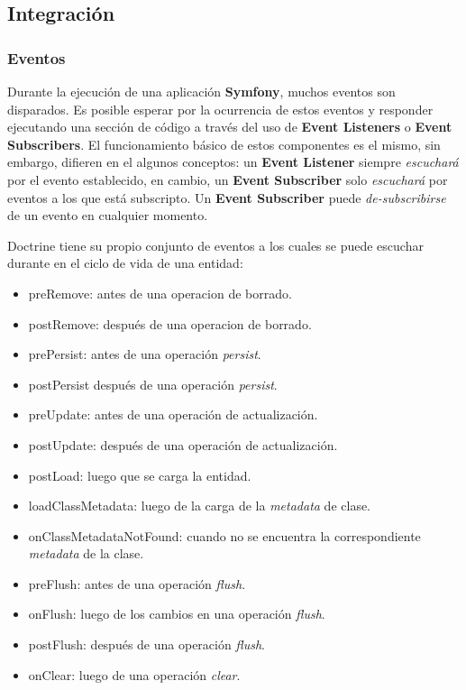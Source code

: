 \subsection{Integración}

\subsubsection{Eventos}%
\label{ssub:eventos}


Durante la ejecución de una aplicación \textbf{Symfony}, muchos eventos son disparados\@. Es posible esperar por la ocurrencia de estos eventos y responder ejecutando una sección de código a través del
uso de \textbf{Event Listeners} o \textbf{Event Subscribers}\@. El funcionamiento básico de estos componentes es el mismo, sin embargo, difieren en el algunos conceptos:
un \textbf{Event Listener} siempre \textit{escuchará} por el evento establecido, en cambio, un \textbf{Event Subscriber} solo \textit{escuchará} por eventos a los que está subscripto\@. Un \textbf{Event Subscriber} puede \textit{de-subscribirse} de un evento en cualquier momento.


Doctrine tiene su propio conjunto de eventos a los cuales se puede escuchar durante en el ciclo de vida de una entidad:

\begin{itemize}
    \item preRemove: antes de una operacion de borrado.
    \item postRemove: después de una operacion de borrado.
    \item prePersist: antes de una operación \textit{persist}.
    \item postPersist después de una operación \textit{persist}.
    \item preUpdate: antes de una operación de actualización.
    \item postUpdate: después de una operación de actualización.
    \item postLoad: luego que se carga la entidad.
    \item loadClassMetadata: luego de la carga de la \textit{metadata} de clase.
    \item onClassMetadataNotFound: cuando no se encuentra la correspondiente \textit{metadata} de la clase.
    \item preFlush: antes de una operación \textit{flush}.
    \item onFlush: luego de los cambios en una operación \textit{flush}.
    \item postFlush: después de una operación \textit{flush}.
    \item onClear: luego de una operación \textit{clear}.
\end{itemize}

